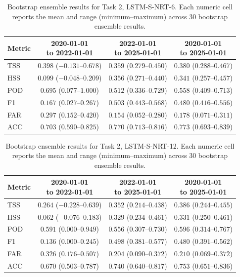 \begin{table}[htbp]
\centering
\small
\caption{Bootstrap ensemble results for Task 2, LSTM-S-NRT-6. Each numeric cell reports the mean and range (minimum--maximum) across 30 bootstrap ensemble results.}
\label{tab:app-task2-lstm-s-nrt-6}
\begin{tabular}{lccc}
\toprule
Metric & \shortstack{2020-01-01\\to 2022-01-01} & \shortstack{2022-01-01\\to 2025-01-01} & \shortstack{2020-01-01\\to 2025-01-01} \\
\midrule
TSS & $0.398$ ($-0.131$--$0.678$) & $0.359$ ($0.279$--$0.450$) & $0.380$ ($0.288$--$0.467$) \\
HSS & $0.099$ ($-0.048$--$0.209$) & $0.356$ ($0.271$--$0.440$) & $0.341$ ($0.257$--$0.457$) \\
POD & $0.695$ ($0.077$--$1.000$) & $0.512$ ($0.336$--$0.729$) & $0.558$ ($0.409$--$0.713$) \\
F1 & $0.167$ ($0.027$--$0.267$) & $0.503$ ($0.443$--$0.568$) & $0.480$ ($0.416$--$0.556$) \\
FAR & $0.297$ ($0.152$--$0.420$) & $0.154$ ($0.052$--$0.280$) & $0.178$ ($0.071$--$0.311$) \\
ACC & $0.703$ ($0.590$--$0.825$) & $0.770$ ($0.713$--$0.816$) & $0.773$ ($0.693$--$0.839$) \\
\bottomrule
\end{tabular}
\end{table}
\clearpage

\begin{table}[htbp]
\centering
\small
\caption{Bootstrap ensemble results for Task 2, LSTM-S-NRT-12. Each numeric cell reports the mean and range (minimum--maximum) across 30 bootstrap ensemble results.}
\label{tab:app-task2-lstm-s-nrt-12}
\begin{tabular}{lccc}
\toprule
Metric & \shortstack{2020-01-01\\to 2022-01-01} & \shortstack{2022-01-01\\to 2025-01-01} & \shortstack{2020-01-01\\to 2025-01-01} \\
\midrule
TSS & $0.264$ ($-0.228$--$0.639$) & $0.352$ ($0.214$--$0.438$) & $0.386$ ($0.244$--$0.455$) \\
HSS & $0.062$ ($-0.076$--$0.183$) & $0.329$ ($0.234$--$0.461$) & $0.331$ ($0.250$--$0.461$) \\
POD & $0.591$ ($0.000$--$0.949$) & $0.556$ ($0.307$--$0.730$) & $0.596$ ($0.314$--$0.767$) \\
F1 & $0.136$ ($0.000$--$0.245$) & $0.498$ ($0.381$--$0.577$) & $0.480$ ($0.391$--$0.562$) \\
FAR & $0.326$ ($0.176$--$0.507$) & $0.204$ ($0.090$--$0.372$) & $0.210$ ($0.069$--$0.372$) \\
ACC & $0.670$ ($0.503$--$0.787$) & $0.740$ ($0.640$--$0.817$) & $0.753$ ($0.651$--$0.836$) \\
\bottomrule
\end{tabular}
\end{table}
\clearpage

